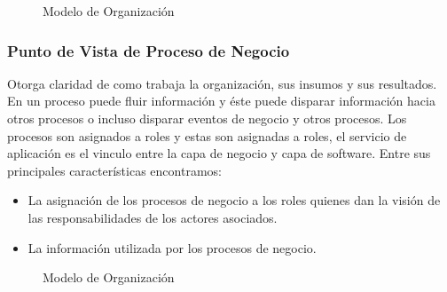 \begin{figure}[th!]
	\centering
	\caption{Modelo de Organización}
	\label{fig:morganizacion}
\end{figure}

\subsubsection{Punto de Vista de Proceso de Negocio}
Otorga claridad de como trabaja la organización, sus insumos y sus resultados.
En un proceso puede fluir información y éste puede disparar información hacia otros procesos o incluso disparar eventos de negocio y otros procesos. Los procesos son asignados a roles y estas son asignadas a roles, el servicio de aplicación es el vinculo entre la capa de negocio y capa de software. Entre sus principales características encontramos:

\begin{itemize}
	\item La asignación de los procesos de negocio a los roles quienes dan la visión de las responsabilidades de los actores asociados.
	\item La información utilizada por los procesos de negocio.
\end{itemize}
\begin{figure}[th!]
	\centering
	\caption{Modelo de Organización}
	\label{fig:morganizacion}
\end{figure}


